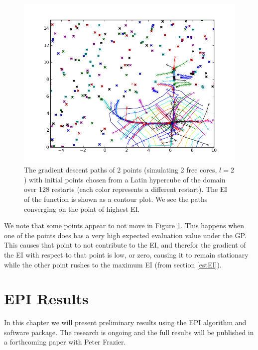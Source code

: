 \documentclass[phd,tocprelim]{cornell}
\begin{document}
\begin{figure}[hpt]
 	\centerline{\includegraphics[width=\textwidth]{figures/EPI/branin_2d_32pk_paths_and_EI.png}}
    \caption[Gradient descent paths in Branin Function]{The gradient descent paths of 2 points (simulating 2 free cores, $l=2$) with initial points chosen from a Latin hypercube of the domain over 128 restarts (each color represents a different restart). The EI of the function is shown as a contour plot. We see the paths converging on the point of highest EI.}
 	\label{fig:pk_paths}
 \end{figure}

 We note that some points appear to not move in Figure \ref{fig:pk_paths}. This happens when one of the points does has a very high expected evaluation value under the GP. This causes that point to not contribute to the EI, and therefor the gradient of the EI with respect to that point is low, or zero, causing it to remain stationary while the other point rushes to the maximum EI (from section \ref{estEI}).



\chapter{EPI Results} %
\label{cha:EPI Results}

In this chapter we will present preliminary results using the EPI algorithm and software package. The research is ongoing and the full results will be published in a forthcoming paper with Peter Frazier.

\end{document}
